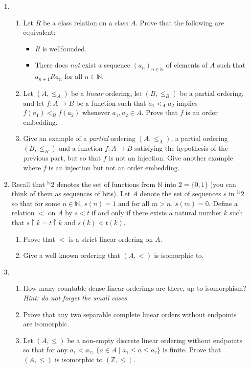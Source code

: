 \documentclass{amsart}
\theoremstyle{definition}
\newcommand{\seq}[2]{\left(#1\right)_{#2}}
\newcommand{\fct}[2]{{}^{#1} {#2}}
\newcommand{\Nn}{\mathbb{N}}
\newcommand{\Zz}{\mathbb{Z}}
\newcommand{\rest}{\upharpoonright}
\begin{document}
\begin{enumerate}
\item
  \begin{enumerate}
  \item Let $R$ be a class relation on a class $A$. Prove that the following are equivalent:
    \begin{itemize}
    \item $R$ is wellfounded.
    \item There does \emph{not} exist a sequence $\seq{a_n}{n \in \Nn}$ of elements of $A$ such that $a_{n + 1} R a_n$ for all $n \in \Nn$.
    \end{itemize}
  \item Let $(A, \le_A)$ be a \emph{linear} ordering, let $(B, \le_B)$ be a partial ordering, and let $f: A \to B$ be a function such that $a_1 <_A a_2$ implies $f (a_1) <_B f (a_2)$ whenever $a_1, a_2 \in A$. Prove that $f$ is an order embedding.
  \item Give an example of a \emph{partial} ordering $(A, \le_A)$, a partial ordering $(B, \le_B)$ and a function $f: A \to B$ satisfying the hypothesis of the previous part, but so that $f$ is not an injection. Give another example where $f$ is an injection but not an order embedding.
  \end{enumerate}
\item Recall that $\fct{\Nn}{2}$ denotes the set of functions from $\Nn$ into $2 = \{0,1\}$ (you can think of them as sequences of bits). Let $A$ denote the set of sequences $s$ in $\fct{\Nn}{2}$ so that for some $n \in \Nn$, $s (n) = 1$ and for all $m > n$, $s (m) = 0$. Define a relation $<$ on $A$ by $s < t$ if and only if there exists a natural number $k$ such that $s \rest k = t \rest k$ and $s (k) < t (k)$.

  \begin{enumerate}
  \item Prove that $<$ is a strict linear ordering on $A$.
  \item Give a well known ordering that $(A, <)$ is isomorphic to.
  \end{enumerate}

\item
  \begin{enumerate}
  \item How many countable dense linear orderings are there, up to isomorphism? \emph{Hint: do not forget the small cases.}  
  \item Prove that any two separable complete linear orders without endpoints are isomorphic.
  \item Let $(A, \le)$ be a non-empty discrete linear ordering without endpoints so that for any $a_1 < a_2$, $\{a \in A \mid a_1 \le a \le a_2\}$ is finite. Prove that $(A, \le)$ is isomorphic to $(\Zz, \le)$.


\end{enumerate}
\end{enumerate}
\end{document}
